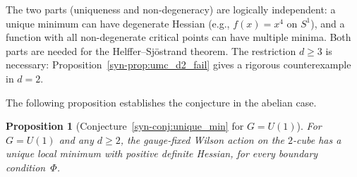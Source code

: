\documentclass[11pt]{article}
\newtheorem{proposition}[theorem]{Proposition}
\theoremstyle{definition}
\begin{document}
\noindent
The two parts (uniqueness and non-degeneracy) are logically
independent: a unique minimum can have degenerate Hessian
(e.g., $f(x) = x^4$ on $S^1$), and a function with all
non-degenerate critical points can have multiple minima.
Both parts are needed for the Helffer--Sj\"ostrand theorem.
The restriction $d \geq 3$ is necessary:
Proposition~\ref{syn-prop:umc_d2_fail} gives a rigorous
counterexample in $d = 2$.

The following proposition establishes the conjecture
in the abelian case.

\begin{proposition}[Conjecture~\ref{syn-conj:unique_min}
for $G = U(1)$]
\label{syn-prop:unique_abelian}
For $G = U(1)$ and any $d \geq 2$, the gauge-fixed
Wilson action on the $2$-cube has a unique local
minimum with positive definite Hessian, for every
boundary condition~$\Phi$.
\end{proposition}
\end{document}
